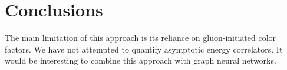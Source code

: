 \section{Conclusions}\label{sec:conclusions}

The main limitation of this approach is its reliance on gluon-initiated
color factors. We have not attempted to quantify asymptotic energy
correlators. It would be interesting to combine this approach with graph
neural networks.

